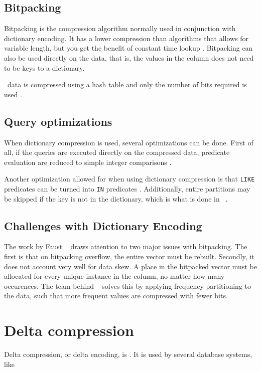 \subsection{Bitpacking}
\label{sub:Bitpacking}
Bitpacking is the compression algorithm normally used in conjunction with dictionary encoding. It has a lower compression than algorithms that allows for variable length, but you get the benefit of constant time lookup \cite{Raman2008-gi}. Bitpacking can also be used directly on the data, that is, the values in the column does not need to be keys to a dictionary.

\qlikview~data is compressed using a hash table and only the number of bits required is used \cite{Qlik2014-vd}.

\subsection{Query optimizations}
\label{sub:Query optimizations}
When dictionary compression is used, several optimizations can be done. First of all, if the queries are executed directly on the compressed data, predicate evaluation are reduced to simple integer comparisons \cite{Johnson2008-cp}.  

Another optimization allowed for when using dictionary compression is that \texttt{LIKE} predicates can be turned into \texttt{IN} predicates \cite{Barber2012-xt}. Additionally, entire partitions may be skipped if the key is not in the dictionary, which is what is done in \blink~\cite{Barber2012-xt}.

\subsection{Challenges with Dictionary Encoding}
\label{sub:Challenges with Dictionary Encoding}
The work by Faust \ea~\cite{Faust2015-ke} draws attention to two major issues with bitpacking. The first is that on bitpacking overflow, the entire vector must be rebuilt. Secondly, it does not account very well for data skew. A place in the bitpacked vector must be allocated for every unique instance in the column, no matter how many occurences. The team behind \blink~\cite{Raman2008-gi} solves this by applying frequency partitioning to the data, such that more frequent values are compressed with fewer bits.

\section{Delta compression}
\label{sec:Delta compression}
Delta compression, or delta encoding, is . It is used by several database systems, like ~\cite{Raman2008-gi}

